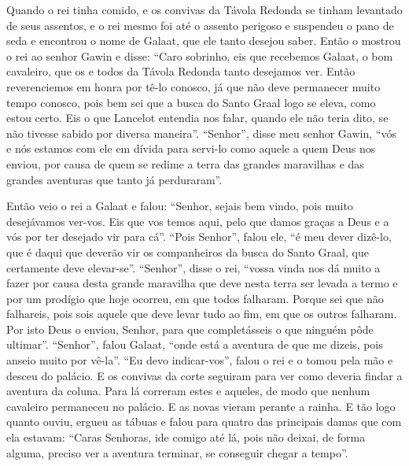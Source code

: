 Quando o rei tinha comido, e os convivas da Távola Redonda se tinham levantado
de seus assentos, e o rei mesmo foi até o assento perigoso e suspendeu o pano
de seda e encontrou o nome de Galaat, que ele tanto desejou saber. Então o
mostrou o rei ao senhor Gawin e disse: “Caro sobrinho, eis que recebemos
Galaat, o bom cavaleiro, que os e todos da Távola Redonda tanto desejamos ver.
Então reverenciemos em honra por tê-lo conosco, já que não deve permanecer
muito tempo conosco, pois bem sei que a busca do Santo Graal logo se eleva,
como estou certo. Eis o que Lancelot entendia nos falar, quando ele não teria
dito, se não tivesse sabido por diversa maneira”. “Senhor”, disse meu senhor
Gawin, “vós e nós estamos com ele em dívida para servi-lo como aquele a quem
Deus nos enviou, por causa de quem se redime a terra das grandes maravilhas e
das grandes aventuras que tanto já perduraram”. 

Então veio o rei a Galaat e falou: “Senhor, sejais bem vindo, pois muito
desejávamos ver-vos. Eis que vos temos aqui, pelo que damos graças a Deus e a
vós por ter desejado vir para cá”. “Pois Senhor”, falou ele, “é meu dever
dizê-lo, que é daqui que deverão vir os companheiros da busca do Santo Graal,
que certamente deve elevar-se”. “Senhor”, disse o rei, “vossa vinda nos dá
muito a fazer por causa desta grande maravilha que deve nesta terra ser levada
a termo e por um prodígio que hoje ocorreu, em que todos falharam. Porque sei
que não falhareis, pois sois aquele que deve levar tudo ao fim, em que os
outros falharam. Por isto Deus o enviou, Senhor, para que completásseis o que
ninguém pôde ultimar”. “Senhor”, falou Galaat, “onde está a aventura de que me
dizeis, pois anseio muito por vê-la”. “Eu devo indicar-vos”, falou o rei e o
tomou pela mão e desceu do palácio. E os convivas da corte seguiram para ver
como deveria findar a aventura da coluna. Para lá correram estes e aqueles, de
modo que nenhum cavaleiro permaneceu no palácio. E as novas vieram perante a
rainha. E tão logo quanto ouviu, ergueu as tábuas e falou para quatro das
principais damas que com ela estavam: “Caras Senhoras, ide comigo até lá, pois
não deixai, de forma alguma, preciso ver a aventura terminar, se conseguir
chegar a tempo”. 

